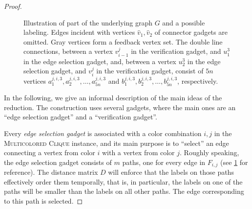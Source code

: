 \documentclass[a4paper,UKenglish,cleveref, autoref, thm-restate]{lipics-v2021}
\begin{document}
\begin{proof}
\begin{figure}%
\noindent{}
    \caption{Illustration of part of the underlying graph $G$ and a possible labeling. Edges incident with vertices $\hat{v}_1,\hat{v}_2$ of connector gadgets are omitted. Gray vertices form a feedback vertex set.
    The double line connections, between a vertex $v_{i-1}^j$ in the verification gadget, and $u_1^3$ in the edge selection gadget, 
    and, between a vertex $u_2^3$ in the edge selection gadget, and $v_{i}^j$ in the verification gadget,
    consist of $5n$ vertices $a_1^{j,i,3},a_2^{j,i,3},\dots,a_{5n}^{j,i,3}$ 
    and $b_1^{j,i,3},b_2^{j,i,3},\dots,b_{5n}^{j,i,3}$, respectively.
    }\label{fig:hardness1}
\end{figure}


In the following, we give an informal description of the main ideas of the reduction. The construction uses several gadgets, where the main ones are an ``edge selection gadget'' and a ``verification gadget''.


Every \emph{edge selection gadget} is associated with a color combination $i,j$ in the \textsc{Multicolored Clique} instance, and its main purpose is to ``select'' an edge connecting a vertex from color $i$ with a vertex from color $j$.
Roughly speaking, the edge selection gadget consists of $m$ paths, one for every edge in $F_{i,j}$ (see \cref{fig:hardness1} for reference). The distance matrix $D$ will enforce that the labels on those paths effectively order them temporally, that is, in particular, the labels on one of the paths will be smaller than the labels on all other paths. The edge corresponding to this path is selected.



\end{proof}
\end{document}
